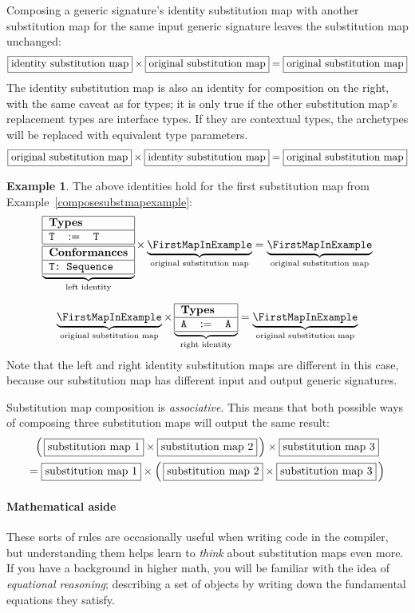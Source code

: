 \documentclass[a4paper,headsepline,bibliography=totoc,toc=flat,fleqn,twoside=semi]{scrbook}
\theoremstyle{definition}
\theoremstyle{definition}
\newtheorem{example}{Example}[chapter]
\theoremstyle{definition}
\newcommand{\mathboxed}[1]{\boxed{\mbox{\vphantom{pI\texttt{pI}}#1}}}
\newcommand{\SubMap}[1]{\begin{tabular}{|lll|}
\hline
\multicolumn{3}{|l|}{\textbf{Types}}\\
\hline
#1\\
\hline
\end{tabular}}
\newcommand{\SubMapC}[2]{\begin{tabular}{|lll|}
\hline
\multicolumn{3}{|l|}{\textbf{Types}}\\
\hline
#1\\
\hline
\hline
\multicolumn{3}{|l|}{\textbf{Conformances}}\\
\hline
#2\\
\hline
\end{tabular}}
\newcommand{\SubType}[2]{\texttt{#1}&$:=$&\texttt{#2}}
\newcommand{\SubConf}[1]{\multicolumn{3}{|l|}{\texttt{#1}}}
\begin{document}
Composing a generic signature's identity substitution map with another substitution map for the same input generic signature leaves the substitution map unchanged:
\[
\mathboxed{identity substitution map}\times \mathboxed{original substitution map} = \mathboxed{original substitution map}
\]
The identity substitution map is also an identity for composition on the right, with the same caveat as for types; it is only true if the other substitution map's replacement types are interface types. If they are contextual types, the archetypes will be replaced with equivalent type parameters.
\[
\mathboxed{original substitution map}\times \mathboxed{identity substitution map} = \mathboxed{original substitution map}
\]
\begin{example}
The above identities hold for the first substitution map from Example~\ref{composesubstmapexample}:
\begin{gather*}
\underbrace{\SubMapC{\SubType{T}{T}}{\SubConf{T:\ Sequence}}}_{\text{left identity}} \times \underbrace{\FirstMapInExample}_{\text{original substitution map}} = \underbrace{\FirstMapInExample}_{\text{original substitution map}}\\[\medskipamount]
\underbrace{\FirstMapInExample}_{\text{original substitution map}} \times \underbrace{\SubMap{\SubType{A}{A}}}_{\text{right identity}} = \underbrace{\FirstMapInExample}_{\text{original substitution map}}
\end{gather*}
Note that the left and right identity substitution maps are different in this case, because our substitution map has different input and output generic signatures.
\end{example}
Substitution map composition is \emph{associative}. This means that both possible ways of composing three substitution maps will output the same result:
\begin{multline*}
\left(\,\mathboxed{substitution map 1}\times \mathboxed{substitution map 2}\,\right)\times \mathboxed{substitution map 3}\\
= \mathboxed{substitution map 1}\times \left(\,\mathboxed{substitution map 2} \times \mathboxed{substitution map 3}\,\right)
\end{multline*}

\paragraph{Mathematical aside}
These sorts of rules are occasionally useful when writing code in the compiler, but understanding them helps learn to \emph{think} about substitution maps even more. If you have a background in higher math, you will be familiar with the idea of \emph{equational reasoning}; describing a set of objects by writing down the fundamental equations they satisfy.
\end{document}
